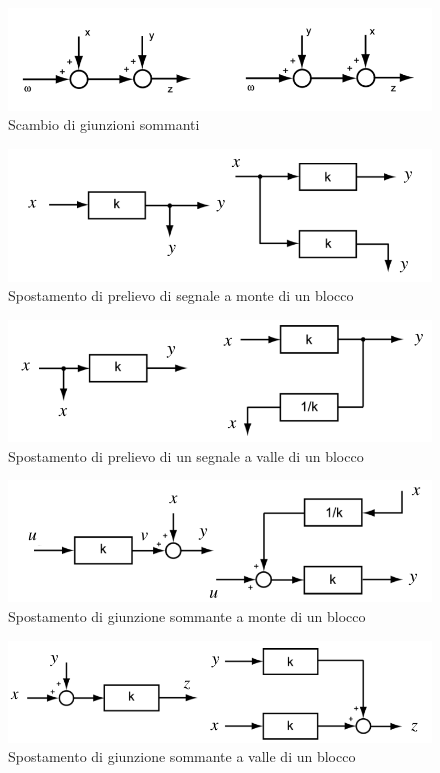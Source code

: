 \begin{figure}[h!]
    \centering
    \includegraphics[width=0.3\linewidth]{images/scambio_giunzioni_sommanti.png}
    \caption{Scambio di giunzioni sommanti}
    \label{fig:scambio_sommanti}
\end{figure}


\begin{figure}[h!]
    \centering
    \includegraphics[width=0.3\linewidth]{images/spostamento_prelievo_segnale.png}
    \caption{Spostamento di prelievo di segnale a monte di un blocco}
    \label{fig:spostamento_prelievo_monte}
\end{figure}


\begin{figure}[h!]
    \centering
    \includegraphics[width=0.3\linewidth]{images/spostamento_prelievo_segnale_a_valle.png}
    \caption{Spostamento di prelievo di un segnale a valle di un blocco}
    \label{fig:spostamento_prelievo_valle}
\end{figure}

\begin{figure}[h!]
  \centering
  \includegraphics[width=0.3\linewidth]{images/spostamento_giunzione_a_monte.png}
  \caption{Spostamento di giunzione sommante a monte di un blocco}
  \label{fig:spostamento_giunzione_monte}
\end{figure}



\begin{figure}[h!]
  \centering
  \includegraphics[width=0.3\linewidth]{images/spostamento_giunzione_a_valle.png}
  \caption{Spostamento di giunzione sommante a valle di un blocco}
  \label{fig:spostamento_giunzione_valle}
\end{figure}


